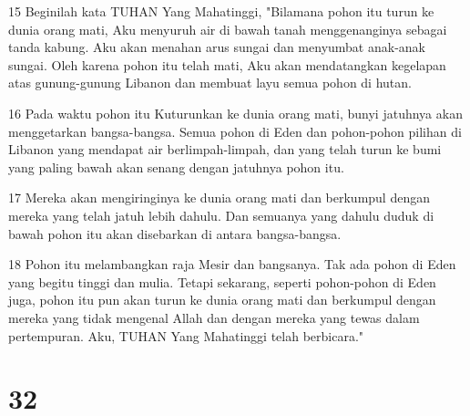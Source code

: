 \par 15 Beginilah kata TUHAN Yang Mahatinggi, "Bilamana pohon itu turun ke dunia orang mati, Aku menyuruh air di bawah tanah menggenanginya sebagai tanda kabung. Aku akan menahan arus sungai dan menyumbat anak-anak sungai. Oleh karena pohon itu telah mati, Aku akan mendatangkan kegelapan atas gunung-gunung Libanon dan membuat layu semua pohon di hutan.
\par 16 Pada waktu pohon itu Kuturunkan ke dunia orang mati, bunyi jatuhnya akan menggetarkan bangsa-bangsa. Semua pohon di Eden dan pohon-pohon pilihan di Libanon yang mendapat air berlimpah-limpah, dan yang telah turun ke bumi yang paling bawah akan senang dengan jatuhnya pohon itu.
\par 17 Mereka akan mengiringinya ke dunia orang mati dan berkumpul dengan mereka yang telah jatuh lebih dahulu. Dan semuanya yang dahulu duduk di bawah pohon itu akan disebarkan di antara bangsa-bangsa.
\par 18 Pohon itu melambangkan raja Mesir dan bangsanya. Tak ada pohon di Eden yang begitu tinggi dan mulia. Tetapi sekarang, seperti pohon-pohon di Eden juga, pohon itu pun akan turun ke dunia orang mati dan berkumpul dengan mereka yang tidak mengenal Allah dan dengan mereka yang tewas dalam pertempuran. Aku, TUHAN Yang Mahatinggi telah berbicara."

\chapter{32}

